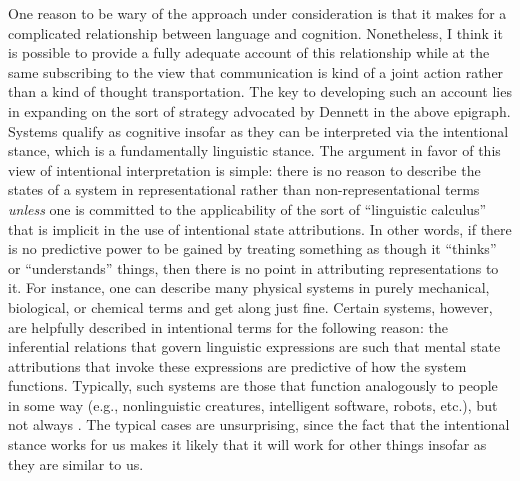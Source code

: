 One reason to be wary of the approach under consideration is that it makes for a complicated relationship between language and cognition. Nonetheless, I think it is possible to provide a fully adequate account of this relationship while at the same subscribing to the view that communication is kind of a joint action rather than a kind of thought transportation. The key to developing such an account lies in expanding on the sort of strategy advocated by Dennett in the above epigraph. Systems qualify as cognitive insofar as they can be interpreted via the intentional stance, which is a fundamentally linguistic stance. The argument in favor of this view of intentional interpretation is simple: there is no reason to describe the states of a system in representational rather than non-representational terms \textit{unless} one is committed to the applicability of the sort of ``linguistic calculus'' that is implicit in the use of intentional state attributions. In other words, if there is no predictive power to be gained by treating something as though it ``thinks'' or ``understands'' things, then there is no point in attributing representations to it. For instance, one can describe many physical systems in purely mechanical, biological, or chemical terms and get along just fine. Certain systems, however, are helpfully described in intentional terms for the following reason: the inferential relations that govern linguistic expressions are such that mental state attributions that invoke these expressions are predictive of how the system functions. Typically, such systems are those that function analogously to people in some way (e.g., nonlinguistic creatures, intelligent software, robots, etc.), but not always \citep{Hochstein:2011}. The typical cases are unsurprising, since the fact that the intentional stance works for us makes it likely that it will work for other things insofar as they are similar to us.


